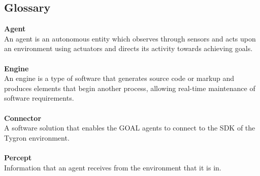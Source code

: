 \newpage

\subsection{Glossary}

\textbf{Agent}\\
An agent is an autonomous entity which observes through sensors and acts upon an environment using actuators and directs its activity towards achieving goals.\\
\\
\textbf{Engine}\\
An engine is a type of software that generates source code or markup and produces elements that begin another process, allowing real-time maintenance of software requirements.\\
\\
\textbf{Connector}\\
A software solution that enables the GOAL agents to connect to the SDK of the Tygron environment.\\
\\
\textbf{Percept}\\
Information that an agent receives from the environment that it is in.